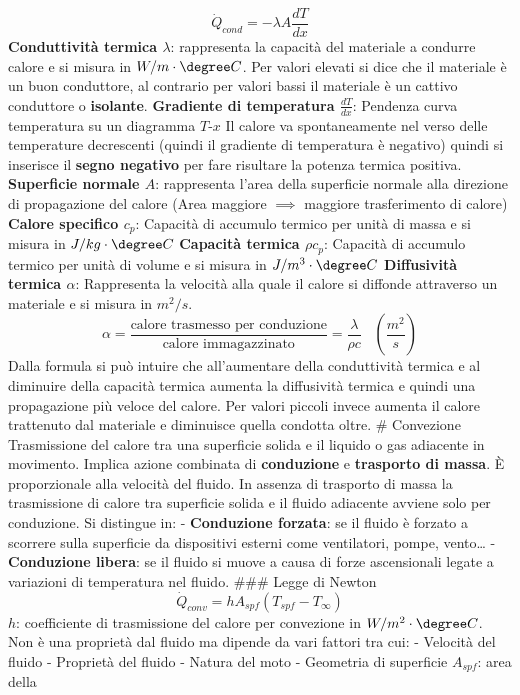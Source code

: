 \[\dot Q_{cond}=-\lambda A\frac{dT}{dx}\] \textbf{Conduttività termica
\(\lambda\)}: rappresenta la capacità del materiale a condurre calore e
si misura in \(W/m\cdot \degree C\). Per valori elevati si dice che il
materiale è un buon conduttore, al contrario per valori bassi il
materiale è un cattivo conduttore o \textbf{isolante}. \textbf{Gradiente
di temperatura \(\frac{dT}{dx}\)}: Pendenza curva temperatura su un
diagramma \(T\)-\(x\) Il calore va spontaneamente nel verso delle
temperature decrescenti (quindi il gradiente di temperatura è negativo)
quindi si inserisce il \textbf{segno negativo} per fare risultare la
potenza termica positiva. \textbf{Superficie normale \(A\)}: rappresenta
l'area della superficie normale alla direzione di propagazione del
calore (Area maggiore \(\implies\) maggiore trasferimento di calore)
\textbf{Calore specifico \(c_p\)}: Capacità di accumulo termico per
unità di massa e si misura in \(J/kg\cdot\degree C\) \textbf{Capacità
termica \(\rho c_p\)}: Capacità di accumulo termico per unità di volume
e si misura in \(J/m^3\cdot\degree C\) \textbf{Diffusività termica
\(\alpha\)}: Rappresenta la velocità alla quale il calore si diffonde
attraverso un materiale e si misura in \(m^2/s\).
\[\alpha=\frac{\text{calore trasmesso per conduzione}}{\text{calore immagazzinato}}=\frac{\lambda}{\rho c}\;\;\;\left(\frac{m^2}{s}\right)\]
Dalla formula si può intuire che all'aumentare della conduttività
termica e al diminuire della capacità termica aumenta la diffusività
termica e quindi una propagazione più veloce del calore. Per valori
piccoli invece aumenta il calore trattenuto dal materiale e diminuisce
quella condotta oltre. \# Convezione Trasmissione del calore tra una
superficie solida e il liquido o gas adiacente in movimento. Implica
azione combinata di \textbf{conduzione} e \textbf{trasporto di massa}. È
proporzionale alla velocità del fluido. In assenza di trasporto di massa
la trasmissione di calore tra superficie solida e il fluido adiacente
avviene solo per conduzione. Si distingue in: - \textbf{Conduzione
forzata}: se il fluido è forzato a scorrere sulla superficie da
dispositivi esterni come ventilatori, pompe, vento\ldots{} -
\textbf{Conduzione libera}: se il fluido si muove a causa di forze
ascensionali legate a variazioni di temperatura nel fluido. \#\#\# Legge
di Newton \[\dot Q_{conv}=hA_{spf}(T_{spf}-T_\infty) \] \(h\):
coefficiente di trasmissione del calore per convezione in
\(W/m^2\cdot\degree C\). Non è una proprietà dal fluido ma dipende da
vari fattori tra cui: - Velocità del fluido - Proprietà del fluido -
Natura del moto - Geometria di superficie \(A_{spf}\): area della
